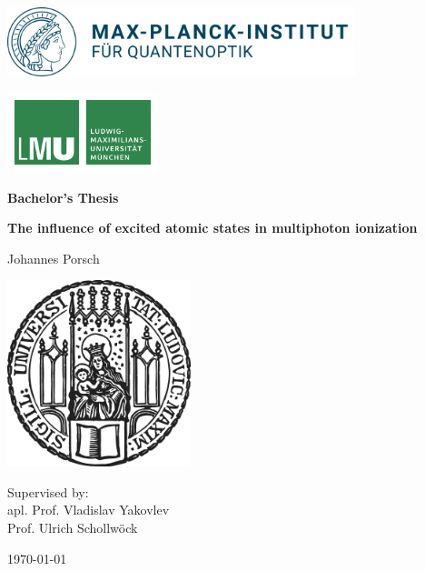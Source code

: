 \begin{titlepage}
    \centering
    
    \begin{minipage}{0.5\textwidth}
        \includegraphics[height=2cm]{figures/mpq.png}
    \end{minipage}
    \hfill
    \begin{minipage}{0.3\textwidth}
        \includegraphics[height=2.3cm]{figures/lmu-logo.pdf}
    \end{minipage}

    

    \vspace{0.5cm}

    
    \vspace{2cm}

    {\Large \bfseries Bachelor's Thesis}

    \vspace{0.5cm}
    
    {\huge\bfseries The influence of excited atomic states in multiphoton ionization\\[0.4cm]}
    
    \vspace{1.5cm}
    
    {\Large Johannes Porsch}
    
    
    \vfill
    
    \includegraphics[width = 0.4\textwidth]{figures/sigillum.png}

     \vfill
    
    Supervised by: \\apl. Prof. Vladislav Yakovlev \\Prof. Ulrich Schollwöck 

    \vfill
    
    {\Large \today}
    
\end{titlepage}